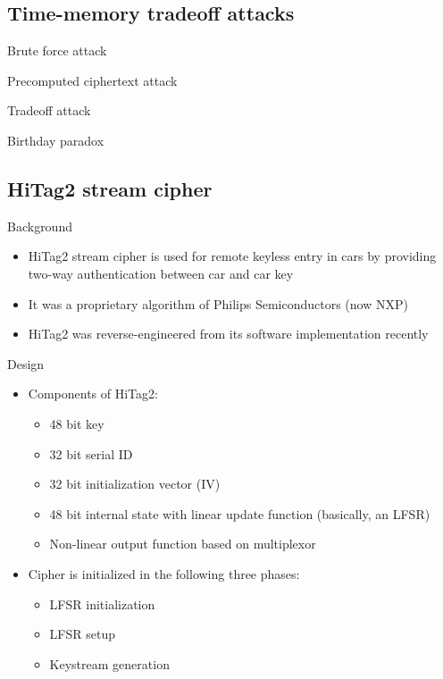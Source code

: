 \documentclass{beamer}
\begin{document}
\subsection{Time-memory tradeoff attacks}

\begin{frame}{Brute force attack}
\end{frame}

\begin{frame}{Precomputed ciphertext attack}
\end{frame}

\begin{frame}{Tradeoff attack}
\end{frame}

\begin{frame}{Birthday paradox}
\end{frame}

\subsection{HiTag2 stream cipher}

\begin{frame}{Background}
\begin{itemize}
\item HiTag2 stream cipher is used for remote keyless entry in cars by providing two-way authentication between car and car key
\item It was a proprietary algorithm of Philips Semiconductors (now NXP)
\item HiTag2 was reverse-engineered from its software implementation recently
\end{itemize}
\end{frame}

\begin{frame}{Design}
\begin{itemize}
	\item Components of HiTag2:
	\begin{itemize}
		\item 48 bit key
		\item 32 bit serial ID
		\item 32 bit initialization vector (IV)
		\item 48 bit internal state with linear update function (basically, an LFSR)
		\item Non-linear output function based on multiplexor
	\end{itemize}
	
	\item Cipher is initialized in the following three phases:
	\begin{itemize}
		\item LFSR initialization
		\item LFSR setup
		\item Keystream generation
	\end{itemize}

\end{itemize}
\end{frame}
\end{document}

